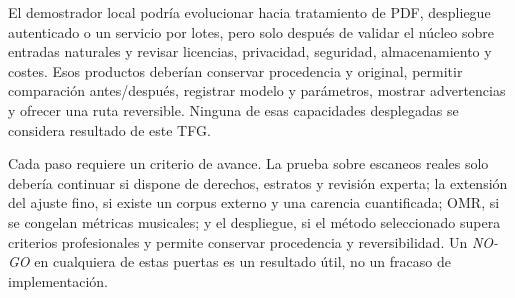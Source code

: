El demostrador local podría evolucionar hacia tratamiento de PDF, despliegue autenticado o un
servicio por lotes, pero solo después de validar el núcleo sobre entradas naturales y revisar
licencias, privacidad, seguridad, almacenamiento y costes. Esos productos deberían conservar
procedencia y original, permitir comparación antes/después, registrar modelo y parámetros, mostrar
advertencias y ofrecer una ruta reversible. Ninguna de esas capacidades desplegadas se considera
resultado de este TFG.

Cada paso requiere un criterio de avance. La prueba sobre escaneos reales solo debería continuar si
dispone de derechos, estratos y revisión experta; la extensión del ajuste fino, si existe un corpus
externo y una carencia cuantificada; OMR, si se congelan métricas musicales; y el despliegue, si el
método seleccionado supera criterios profesionales y permite conservar procedencia y
reversibilidad. Un
\emph{NO-GO} en cualquiera de estas puertas es un resultado útil, no un fracaso de implementación.
